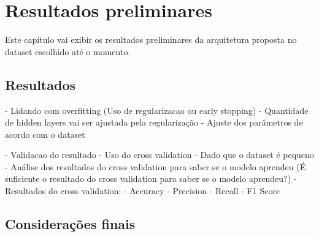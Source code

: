 \chapter{Resultados preliminares}
\label{cap:resultados-preliminares}

Este capítulo vai exibir os resultados preliminares da arquitetura proposta no dataset escolhido até o momento.



\section{Resultados}

 - Lidando com overfitting (Uso de regularizacao ou early stopping) - Quantidade de hidden layers vai ser ajustada pela regularização
         - Ajuste dos parâmetros de acordo com o dataset
      
          - Validacao do resultado 
             - Uso do cross validation - Dado que o dataset é pequeno
             - Análise dos resultados do cross validation para saber se o modelo aprendeu (É suficiente o resultado do cross validation para saber se o modelo aprendeu?)
              - Resultados do cross validation:
                  - Accuracy
                  - Precision
                  - Recall
                  - F1 Score
                  
  
\section{Considerações finais}

